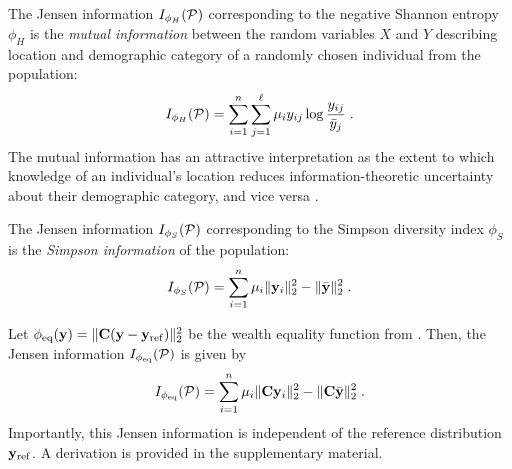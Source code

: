 \begin{example}
  The Jensen information $I_{\phi_H}(\mathcal{P})$ corresponding to the negative Shannon entropy $\phi_H$ is the \emph{mutual information} between the random variables $X$ and $Y$ describing location and demographic category of a randomly chosen individual from the population: 
  \begin{align}
    I_{\phi_H}(\mathcal{P}) = \sum_{i = 1}^n \sum_{j = 1}^{\ell} \mu_i y_{ij} \log \frac{y_{ij}}{\bar{y}_j}\;. \label{eq:shannon-jensen-info}
  \end{align}
  The mutual information has an attractive interpretation as the extent to which knowledge of an individual's location reduces information-theoretic uncertainty about their demographic category, and vice versa \cite{cover2012elements}.
\end{example}

\begin{example}
  The Jensen information $I_{\phi_S}(\mathcal{P})$ corresponding to the Simpson diversity index $\phi_S$ is the \emph{Simpson information} of the population: 
  \begin{align}
    I_{\phi_S}(\mathcal{P}) = \sum_{i = 1}^n \mu_i \lVert \mathbf{y}_i \rVert_2^2 - \lVert \bar{\mathbf{y}} \rVert_2^2 \;. \label{eq:simpson-jensen-info}
  \end{align}
\end{example}

\begin{example}
  Let $\phi_{\mathrm{eq}}(\mathbf{y}) = \lVert \mathbf{C} (\mathbf{y} - \mathbf{y}_{\mathrm{ref}}) \rVert_2^2$ be the wealth equality function from . 
  Then, the Jensen information $I_{\phi_{\mathrm{eq}}}(\mathcal{P})$ is given by 
  \begin{align}
    I_{\phi_{\mathrm{eq}}}(\mathcal{P}) = \sum_{i = 1}^n \mu_i \lVert \mathbf{C}\mathbf{y}_i \rVert_2^2 - \lVert \mathbf{C}\bar{\mathbf{y}} \rVert_2^2 \;. \label{eq:wealth-jensen-info}
  \end{align}
  Importantly, this Jensen information is independent of the reference distribution $\mathbf{y}_{\mathrm{ref}}$. A derivation is provided in the supplementary material. 
\end{example}

